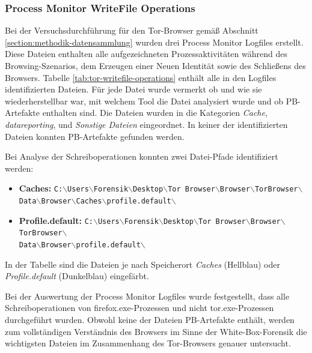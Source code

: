 \begin{appendices}
\subsubsection*{Process Monitor WriteFile Operations}
\label{subsubsection:appendix-tor-common-locations-writefile-operations}
Bei der Versuchsdurchführung für den Tor-Browser gemäß Abschnitt \ref{section:methodik-datensammlung} wurden drei Process Monitor Logfiles erstellt.
Diese Dateien enthalten alle aufgezeichneten Prozessaktivitäten während des Browsing-Szenarios, dem Erzeugen einer \glqq{}Neuen Identität\grqq{} sowie des Schließens des Browsers.
Tabelle \ref{tab:tor-writefile-operations} enthält alle in den Logfiles identifizierten Dateien.
Für jede Datei wurde vermerkt ob und wie sie wiederherstellbar war, mit welchem Tool die Datei analysiert wurde und ob PB-Artefakte enthalten sind.
Die Dateien wurden in die Kategorien \textit{Cache}, \textit{datareporting}, und \textit{Sonstige Dateien} eingeordnet.
In keiner der identifizierten Dateien konnten PB-Artefakte gefunden werden. 

Bei Analyse der Schreiboperationen konnten zwei Datei-Pfade identifiziert werden:
\begin{itemize}
\item \textbf{Caches:} \texttt{C:$\backslash$Users$\backslash$Forensik$\backslash$Desktop$\backslash$Tor Browser$\backslash$Browser$\backslash$TorBrowser$\backslash$\\Data$\backslash$Browser$\backslash$Caches$\backslash$profile.default$\backslash$}
\item \textbf{Profile.default:} \texttt{C:$\backslash$Users$\backslash$Forensik$\backslash$Desktop$\backslash$Tor Browser$\backslash$Browser$\backslash$TorBrowser$\backslash$\\Data$\backslash$Browser$\backslash$profile.default$\backslash$}
\end{itemize}
In der Tabelle sind die Dateien je nach Speicherort \textit{Caches} (Hellblau) oder \textit{Profile.default} (Dunkelblau) eingefärbt. 

Bei der Auswertung der Process Monitor Logfiles wurde festgestellt, dass alle Schreiboperationen von \glqq{}firefox.exe\grqq{}-Prozessen und nicht \glqq{}tor.exe\grqq{}-Prozessen durchgeführt wurden. Obwohl keine der Dateien PB-Artefakte enthält, werden zum vollständigen Verständnis des Browsers im Sinne der White-Box-Forensik die wichtigsten Dateien im Zusammenhang des Tor-Browsers genauer untersucht.


\end{appendices}
